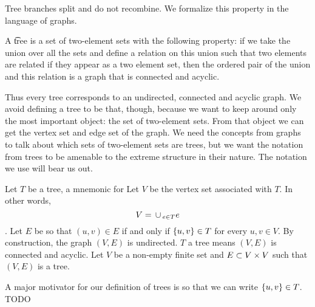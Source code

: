 
\sbasic













\sstart
{}


Tree branches split and do not recombine.
We formalize this property in the language of graphs.

A \t{tree} is a set of two-element sets with the following property: if we take the union over all the sets and define a relation on this union such that two elements are related if they appear as a two element set, then the ordered pair of the union and this relation is a graph that is connected and acyclic.

Thus every tree corresponds to an undirected, connected and acyclic graph.
We avoid defining a tree to be that, though, because we want to keep around only the most important object: the set of two-element sets.
From that object we can get the vertex set and edge set of the graph.
We need the concepts from graphs to talk about which sets of two-element sets are trees, but we want the notation from trees to be amenable to the extreme structure in their nature.
The notation we use will bear us out.


Let $T$ be a tree, a mnemonic for 
Let $V$ be the vertex set associated with $T$.
In other words, $$V = \,\cup\,_{e \in T} e$$.
Let $E$ be so that $(u, v) \in E$ if and only if $\{u, v\} \in T$ for every $u, v \in V$.
By construction, the graph $(V, E)$ is undirected.
$T$ a tree means $(V, E)$ is connected and acyclic.
Let $V$ be a non-empty finite set and $E \subset V \times V$ such that $(V, E)$ is a tree.

A major motivator for our definition of trees is so that we can write $\{u, v\} \in T$. TODO

%
%

